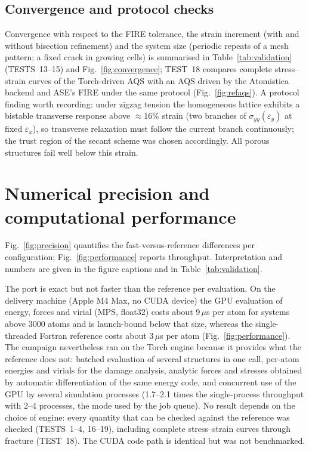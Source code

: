 \subsection{Convergence and protocol checks}
Convergence with respect to the FIRE tolerance, the strain increment (with and without bisection refinement) and the system size (periodic repeats of a mesh pattern; a fixed crack in growing cells) is summarised in Table~\ref{tab:validation} (TESTS~13--15) and Fig.~\ref{fig:convergence}; TEST~18 compares complete stress--strain curves of the Torch-driven AQS with an AQS driven by the Atomistica backend and ASE's FIRE under the same protocol (Fig.~\ref{fig:refaqs}). A protocol finding worth recording: under zigzag tension the homogeneous \rebo{} lattice exhibits a bistable transverse response above $\approx16\%$ strain (two branches of $\sigma_{yy}(\varepsilon_y)$ at fixed $\varepsilon_x$), so transverse relaxation must follow the current branch continuously; the trust region of the secant scheme was chosen accordingly. All porous structures fail well below this strain.

\section{Numerical precision and computational performance}
\label{sec:perf}
Fig.~\ref{fig:precision} quantifies the fast-versus-reference differences per configuration; Fig.~\ref{fig:performance} reports throughput. Interpretation and numbers are given in the figure captions and in Table~\ref{tab:validation}.

The port is exact but not faster than the reference per evaluation. On the delivery machine (Apple M4 Max, no CUDA device) the GPU evaluation of energy, forces and virial (MPS, float32) costs about 9\,$\mu$s per atom for systems above 3000 atoms and is launch-bound below that size, whereas the single-threaded Fortran reference costs about 3\,$\mu$s per atom (Fig.~\ref{fig:performance}). The campaign nevertheless ran on the Torch engine because it provides what the reference does not: batched evaluation of several structures in one call, per-atom energies and virials for the damage analysis, analytic forces and stresses obtained by automatic differentiation of the same energy code, and concurrent use of the GPU by several simulation processes (1.7--2.1 times the single-process throughput with 2--4 processes, the mode used by the job queue). No result depends on the choice of engine: every quantity that can be checked against the reference was checked (TESTS~1--4, 16--19), including complete stress--strain curves through fracture (TEST~18). The CUDA code path is identical but was not benchmarked.
